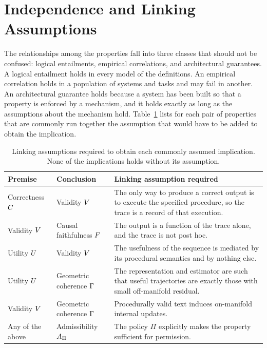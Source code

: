 \section{Independence and Linking Assumptions}

The relationships among the properties fall into three classes that should not be confused: logical entailments, empirical correlations, and architectural guarantees. A logical entailment holds in every model of the definitions. An empirical correlation holds in a population of systems and tasks and may fail in another. An architectural guarantee holds because a system has been built so that a property is enforced by a mechanism, and it holds exactly as long as the assumptions about the mechanism hold. Table~\ref{tab:linking} lists for each pair of properties that are commonly run together the assumption that would have to be added to obtain the implication.

\begin{table}[t]
\centering
\small
\renewcommand{\arraystretch}{1.25}
\begin{tabular}{p{3.2cm}p{3.2cm}p{6.6cm}}
\toprule
Premise & Conclusion & Linking assumption required \\
\midrule
Correctness $C$ & Validity $V$ & The only way to produce a correct output is to execute the specified procedure, so the trace is a record of that execution. \\
Validity $V$ & Causal faithfulness $F$ & The output is a function of the trace alone, and the trace is not post hoc. \\
Utility $U$ & Validity $V$ & The usefulness of the sequence is mediated by its procedural semantics and by nothing else. \\
Utility $U$ & Geometric coherence $\Gamma$ & The representation and estimator are such that useful trajectories are exactly those with small off-manifold residual. \\
Validity $V$ & Geometric coherence $\Gamma$ & Procedurally valid text induces on-manifold internal updates. \\
Any of the above & Admissibility $A_\Pi$ & The policy $\Pi$ explicitly makes the property sufficient for permission. \\
\bottomrule
\end{tabular}
\caption{Linking assumptions required to obtain each commonly assumed implication. None of the implications holds without its assumption.}
\label{tab:linking}
\end{table}

